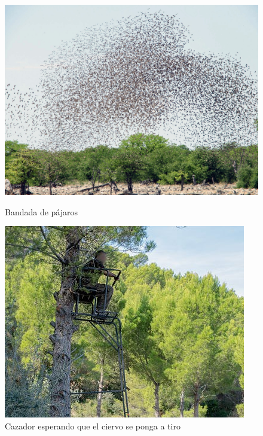 \begin{figure}[h]
    \centering
    \begin{minipage}{.3\textwidth}
        \centering
        \includegraphics[width=\linewidth]{./imagenes/bandada.jpg}
        \caption{Bandada de pájaros}
    \end{minipage}
    \hfill %
    \begin{minipage}{.3\textwidth}
        \centering
        \includegraphics[width=\linewidth]{./imagenes/caza.jpg}
        \caption{Cazador esperando que el ciervo se ponga a tiro}
    \end{minipage}
    \hfill

\end{figure}
